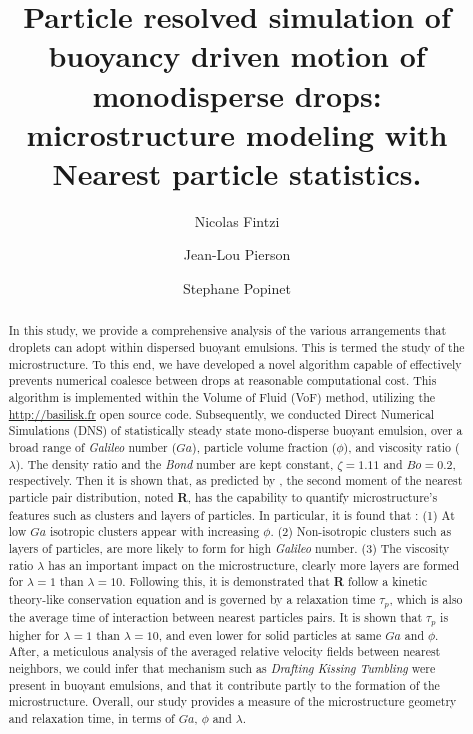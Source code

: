 \documentclass[11pt]{My_preprint}
\title{
    Particle resolved simulation of buoyancy driven motion of monodisperse drops: microstructure modeling with Nearest particle statistics.
    }
\author[1,2]{Nicolas Fintzi}
\author[1]{Jean-Lou Pierson}
\author[2]{Stephane Popinet}
\affil[1]{IFP Energies Nouvelles, Rond-point de l’echangeur de Solaize, 69360 Solaize}
\affil[2]{Sorbonne Universit\'e, Institut Jean le Rond d'Alembert, 4 place Jussieu, 75252 PARIS CEDEX 05, France}
\begin{document}
\maketitle

\begin{abstract}
    In this study, we provide a comprehensive analysis of the various  arrangements that droplets can adopt within dispersed buoyant emulsions. 
    This is termed the study of the microstructure.
    To this end, we have developed a novel algorithm capable of effectively prevents numerical coalesce between drops at reasonable computational cost.
    This algorithm is implemented within the Volume of Fluid (VoF) method, utilizing the \href{http://basilisk.fr}{http://basilisk.fr} open source code. 
    Subsequently, we conducted Direct Numerical Simulations (DNS) of statistically steady state mono-disperse buoyant emulsion, over a broad range of \textit{Galileo} number ($Ga$), particle volume fraction ($\phi$), and viscosity ratio ($\lambda$). 
    The density ratio and the \textit{Bond} number are kept constant, $\zeta = 1.11$ and  $Bo = 0.2$, respectively. 
    Then it is shown that, as predicted by \citet{zhang2023evolution}, the second moment of the nearest particle pair distribution, noted \textbf{R}, has the capability to quantify microstructure's features such as clusters and layers of particles.
    In particular, it is found that : 
    (1) At low $Ga$ isotropic clusters appear with increasing $\phi$. 
    (2) Non-isotropic clusters such as layers of particles, are more likely to form for high \textit{Galileo} number.
    (3) The viscosity ratio $\lambda$ has an important impact on the microstructure, clearly more layers are formed for $\lambda = 1$ than $\lambda = 10$. 
    Following this, it is  demonstrated that \textbf{R} follow a kinetic theory-like conservation equation and is governed by a relaxation time $\tau_p$, which is also the average time of interaction between nearest particles pairs. 
    It is shown that $\tau_p$ is higher for $\lambda = 1$ than 
    $\lambda = 10$, and even lower for solid particles at same $Ga$ and $\phi$.
    After, a meticulous analysis of the averaged relative velocity fields between nearest neighbors, we could infer that mechanism such as \textit{Drafting Kissing Tumbling} \citep{fortes1987nonlinear} were present in buoyant emulsions, and that it contribute partly to the formation of the microstructure.
    Overall, our study provides a measure of the microstructure geometry and relaxation time, in terms of $Ga$, $\phi$ and $\lambda$. 
\end{abstract}
\end{document}
